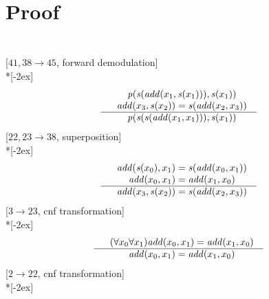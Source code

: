 \documentclass[fleqn]{article}
\newenvironment{VampireProof}{%
   \section{Proof}}{}
\newenvironment{VampireInference}{%
   \begin{array}{c}}{\end{array}}
\newenvironment{VampirePremise}%
   {\begin{array}{l}}%
   {\end{array}}
\newenvironment{VampireConclusion}%
   {\begin{array}{l}}%
   {\end{array}}
\newcommand{\VPremiseSeparator}{\\}
\newcommand{\VConclusionSeparator}{\\ \hline}
\begin{document}
\begin{VampireProof}
\[\begin{VampireInference}
\begin{VampireConclusion}
\end{VampireConclusion}
\end{VampireInference}
\]
[$41,38\rightarrow 45$, forward demodulation]\\*[-2ex]
\[\begin{VampireInference}
\begin{VampirePremise}%
~~\mathit{p} (\mathit{s} (\mathit{add} (x_{1},\mathit{s} (x_{1}))),\mathit{s} (x_{1}))
\end{VampirePremise}
\VPremiseSeparator
\begin{VampirePremise}%
~~\mathit{add} (x_{3},\mathit{s} (x_{2})) = \mathit{s} (\mathit{add} (x_{2},x_{3}))
\end{VampirePremise}
\VConclusionSeparator
\begin{VampireConclusion}
~~\mathit{p} (\mathit{s} (\mathit{s} (\mathit{add} (x_{1},x_{1}))),\mathit{s} (x_{1}))
\end{VampireConclusion}
\end{VampireInference}
\]
[$22,23\rightarrow 38$, superposition]\\*[-2ex]
\[\begin{VampireInference}
\begin{VampirePremise}%
~~\mathit{add} (\mathit{s} (x_{0}),x_{1}) = \mathit{s} (\mathit{add} (x_{0},x_{1}))
\end{VampirePremise}
\VPremiseSeparator
\begin{VampirePremise}%
~~\mathit{add} (x_{0},x_{1}) = \mathit{add} (x_{1},x_{0})
\end{VampirePremise}
\VConclusionSeparator
\begin{VampireConclusion}
~~\mathit{add} (x_{3},\mathit{s} (x_{2})) = \mathit{s} (\mathit{add} (x_{2},x_{3}))
\end{VampireConclusion}
\end{VampireInference}
\]
[$3\rightarrow 23$, cnf transformation]\\*[-2ex]
\[\begin{VampireInference}
\begin{VampirePremise}%
~~(\forall x_{0} \forall x_{1} )\mathit{add} (x_{0},x_{1}) = \mathit{add} (x_{1},x_{0})
\end{VampirePremise}
\VConclusionSeparator
\begin{VampireConclusion}
~~\mathit{add} (x_{0},x_{1}) = \mathit{add} (x_{1},x_{0})
\end{VampireConclusion}
\end{VampireInference}
\]
[$2\rightarrow 22$, cnf transformation]\\*[-2ex]

\end{VampireProof}
\end{document}
